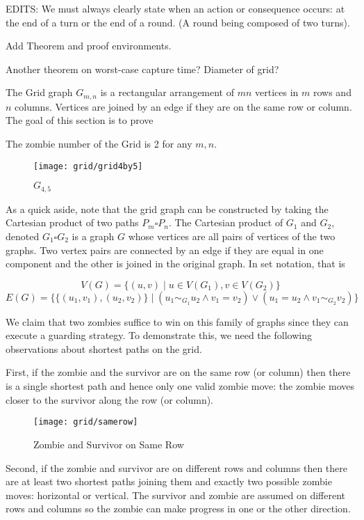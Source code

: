 EDITS: We must always clearly state when an action or consequence occurs: at the end of a turn
or the end of a round. (A round being composed of two turns).

Add Theorem and proof environments.

Another theorem on worst-case capture time? Diameter of grid?

The Grid graph $G_{m,n}$ is a rectangular arrangement of $mn$ vertices in
$m$ rows and $n$ columns. Vertices are joined by an edge if they are on the same
row or column. The goal of this section is to prove

\begin{theorem} The zombie number of the Grid is 2 for any $m, n$.
\end{theorem}

\begin{figure}
  \centering
  \texttt{[image: grid/grid4by5]}
  \caption{$G_{4,5}$ \label{fig:grid4by5}}
\end{figure}

As a quick aside, note that the grid graph can be constructed by taking the
Cartesian product of two paths $P_m \square P_n$.
The Cartesian product of $G_1$ and $G_2$, denoted $G_1 \square G_2$ is a graph $G$ whose
 vertices are all pairs of vertices of the two graphs.
Two vertex pairs are connected by an edge if they are equal in one component and
the other is joined in the original graph. In set notation, that is

\[V(G) = \{ (u, v) \mid u \in V(G_1), v \in V(G_2) \} \]
\[E(G) = \{ \{(u_1, v_1), (u_2, v_2) \} \mid (u_1 \sim_{G_1} u_2 \land v_1 = v_2) \lor (u_1 = u_2 \land v_1 \sim_{G_2} v_2) \} \]

We claim that two zombies suffice to win on this family of graphs since they can execute
a guarding strategy. To demonstrate this, we need the following observations about shortest
paths on the grid.

First, if the zombie and the survivor are on the same row (or column) then there is a
single shortest path and hence only one valid zombie move: the zombie moves
closer to the survivor along the row (or column).

\begin{figure}
  \centering
  \texttt{[image: grid/samerow]}
  \caption{Zombie and Survivor on Same Row \label{fig:samerow}}
\end{figure}

Second, if the zombie and survivor are on different rows and columns then
 there are at least two shortest paths joining them and exactly
 two possible zombie moves: horizontal or vertical.
The survivor and zombie are assumed on different rows and columns
so the zombie can make progress in one or the other direction.

